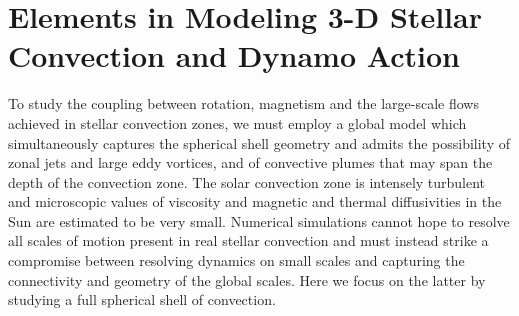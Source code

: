 
\chapter{Elements in Modeling 3-D Stellar Convection and Dynamo Action} %
\label{chapter:ASH}
\label{sec:ASH}

To study the coupling between rotation, magnetism and the
large-scale flows achieved in stellar convection zones, we must
employ a global model which 
simultaneously captures the spherical shell geometry and admits the
possibility of zonal jets and large eddy vortices, and of convective plumes
that may span the depth of the convection zone.  The solar convection
zone is intensely turbulent and microscopic values of viscosity and
magnetic and thermal diffusivities in the Sun are estimated to be very
small.  Numerical simulations cannot hope to resolve all scales of
motion present in real stellar convection and must instead strike a
compromise between resolving dynamics on small scales and capturing
the connectivity and geometry of the global scales. Here we focus on
the latter by studying a full spherical shell of convection.

